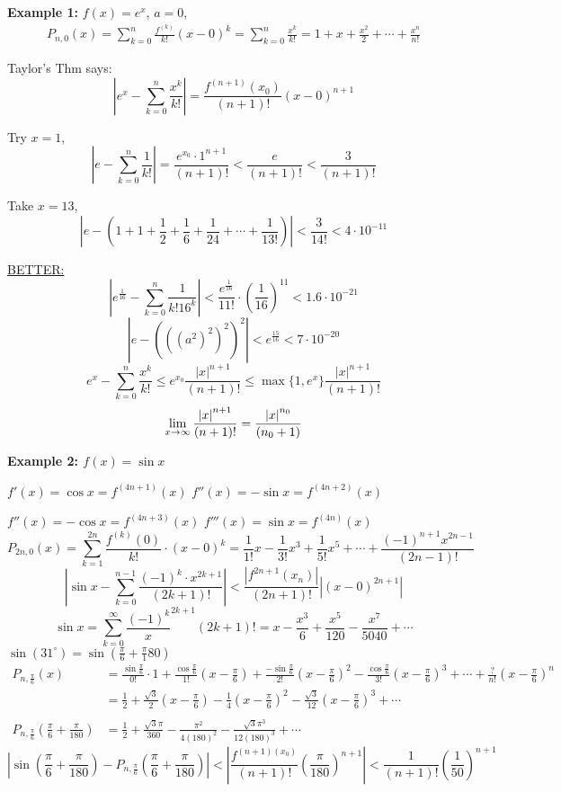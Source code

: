 \documentclass[12pt]{article}
\newcommand{\abs}[1]{\left| #1 \right|}
\theoremstyle{plain}
\newcommand{\dlim}{\displaystyle\lim\limits}
\begin{document}
	{\color{Brown} 

	\textbf{Example 1: }
	$f(x) = e^x$, $a=0$,
	\begin{align*}
		P_{n,0} (x) 
		= \sum_{k=0}^n \frac{f^{(k)}}{k!}(x-0)^k
		= \sum_{k=0}^n \frac{x^k}{k!}
		= 1+x+\frac{x^2}2+\cdots+\frac{x^n}{n!}
	\end{align*}
	
	Taylor's Thm says: 
	\[
		\abs{e^x-\sum_{k=0}^n \frac{x^k}{k!}} 
		=\frac{f^{(n+1)}(x_0)}{(n+1)!} (x-0)^{n+1}
	\]

	Try $x=1$, 
	\[
		\abs{e-\sum_{k=0}^n\frac1{k!}} = \frac{e^{x_0}\cdot 1^{n+1}}{(n+1)!}
		<\frac{e}{(n+1)!}<\frac 3{(n+1)!}
	\]

	Take $x = 13$, 
	\[
		\abs{e-(1+1+\frac12+\frac16+\frac1{24}+\cdots+\frac1{13!})}<\frac3{14!}
		<4\cdot10^{-11} 
	\]

	\underline{BETTER: }
	\[
		\abs{e^{\frac1{16}}-\sum_{k=0}^n\frac1{k! 16^k}}
		<\frac{e^{\frac1{16}}}{11!}\cdot(\frac1{16})^{11}<1.6\cdot 10^{-21}
	\]
	\[
		\abs{e-(((a^2)^2)^2)^2} < e^{\frac{15}{16}}<7\cdot 10^{-20}
	\]
	\[
		e^x-\sum_{k=0}^n \frac{x^k}{k!}\leq e^{x_0} \frac{\abs{x}^{n+1}}{(n+1)!}
		\leq \max\{1, e^x\}\frac{\abs{x}^{n+1}}{(n+1)!} 
	\]
	\[
		\dlim_{x\to \infty} \frac{\abs{x}^{n+1}}{(n+1)!}
		 = \frac{\abs{x}^{n_0}}{(n_0+1)} \\
	\]

	\textbf{Example 2: $f(x) = \sin x$}

	$f'(x) = \cos x = f^{(4n+1)}(x)$ \qquad $f''(x) = -\sin x = f^{(4n+2)}(x)$

	$f''(x) = -\cos x = f^{(4n+3)}(x)$ \qquad $f'''(x) = \sin x = f^{(4n)}(x)$
	\[
		P_{2n,0}(x) = \sum^{2n}_{k=1}\frac{f^{(k)}(0)}{k!} \cdot (x-0)^k
		=\frac1{1!}x-\frac1{3!}x^3+\frac1{5!}x^5+\cdots
		+\frac{(-1)^{n+1}x^{2n-1}}{(2n-1)!}
	\]
	\[
		\abs{\sin x-\sum_{k=0}^{n-1}\frac{(-1)^k\cdot x^{2k+1}}{(2k+1)!}}
		<\frac{\abs{f^{2n+1}(x_n)}}{(2n+1)!}\abs{(x-0)^{2n+1}}
	\]
	\[
		\sin x=\sum_{k=0}^{\infty} \frac{(-1)^k}x^{2k+1}{(2k+1)!}
		=x-\frac{x^3}6+\frac{x^5}{120}-\frac{x^7}{5040}+\cdots
	\]
	$\sin(31^\circ)=\sin (\frac{\pi}6+\frac{\pi}180)$
	\begin{align*}
		P_{n,\frac{\pi}6}(x) 
		&= \frac{\sin\frac{\pi}6}{0!} \cdot 1
			+\frac{\cos \frac{\pi}6}{1!}(x-\frac{\pi}6)+\frac{-\sin\frac{\pi}6}{2!}
			(x-\frac{\pi}6)^2-\frac{\cos \frac{\pi}6}{3!}(x-\frac{\pi}6)^3
			+\cdots+\frac{?}{n!}(x-\frac{\pi}6)^n\\
		&= \frac12+\frac{\sqrt 3}2(x-\frac{\pi}6)-\frac14(x-\frac{\pi}6)^2
			-\frac{\sqrt 3}{12}(x-\frac{\pi}6)^3+\cdots\\\\
		P_{n,\frac{\pi}6}(\frac{\pi}6+\frac{\pi}{180})
		&= \frac12+\frac{\sqrt 3\pi}{360}-\frac{\pi^2}{4(180)^2}
		-\frac{\sqrt 3\pi^3}{12(180)^3}+\cdots
	\end{align*}
	\[
		\abs{\sin(\frac{\pi}6+\frac{\pi}{180})
		-P_{n,\frac{\pi}6}(\frac{\pi}6+\frac{\pi}{180})}
		<\abs{\frac{f^{(n+1)(x_0)}}{(n+1)!}(\frac{\pi}{180})^{n+1}}
		<\frac1{(n+1)!}(\frac1{50})^{n+1}
	\]

}
\end{document}
